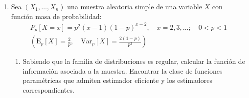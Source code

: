 \documentclass[12pt]{article}
\newcommand{\E}{\mathrm{E}}
\newcommand{\V}{\mathrm{Var}}
\begin{document}
\begin{ejercicio}[2.25 puntos]
\begin{enumerate}[label=\alph*)]
                Sustituimos la primera expresión en la segunda:
                \begin{equation*}
                    3 = (1 + \theta^4) Q'(\theta) + \theta (- \theta^3 Q'(\theta)) = (1 + \theta^4) Q'(\theta) - \theta^4 Q'(\theta) = Q'(\theta)
                \end{equation*}

                Por tanto, $Q'(\theta) = 3$. Integrando respecto de $\theta$ y aplicando la condición inicial $Q(1) = 0$, obtenemos:
                $$Q(\theta) = 3 \theta - 3$$

                Ahora sustituimos $Q'(\theta)$ en la primera ecuación del sistema para obtener $D'(\theta)$:
                $$D'(\theta) = - \theta^3 Q'(\theta) = -3 \theta^3$$

                Integrando respecto de $\theta$ y aplicando la condición inicial $D(0) = 1$, obtenemos:
                $$D(\theta) = 1 - \dfrac{3\theta^4}{4}$$

                En resumen, para $\theta\neq 0$, las funciones $Q(\theta)$ y $D(\theta)$ son:
                $$Q(\theta) = 3(\theta - 1) \quad D(\theta) = 1 - \dfrac{3\theta^4}{4}$$

                No obstante, como la familia es regular, la función de densidad (y por tanto $Q(\theta)$ y $D(\theta)$) deben ser derivables (y por tanto continuas) en todo $\theta \in \Theta$. Por tanto, podemos extender las funciones $Q(\theta)$ y $D(\theta)$ a $\theta = 0$ en el caso de que $\Theta$ contenga el valor $\theta = 0$. Por tanto, las funciones $Q(\theta)$ y $D(\theta)$ son:
                $$Q(\theta) = 3(\theta - 1) \quad D(\theta) = 1 - \dfrac{3\theta^4}{4}$$

            \item Sea $(X_1,\ldots,X_n)$ una muestra aleatoria simple de una variable $X$ con función masa de probabilidad:
                \begin{gather*}
                    P_p[X=x] = p^2(x-1){(1-p)}^{x-2}, \quad x=2,3,\ldots; \quad 0<p<1 \\ \left(\E_p[X] = \frac{2}{p}, \quad \V_p[X]= \frac{2(1-p)}{p^2}\right)
                \end{gather*}
                \begin{enumerate}[label=\alph*)]
                    \item Sabiendo que la familia de distribuciones es regular, calcular la función de información asociada a la muestra. 
                    Encontrar la clase de funciones paramétricas que admiten estimador eficiente y los estimadores correspondientes. \\


\end{enumerate}
\end{enumerate}
\end{ejercicio}
\end{document}
